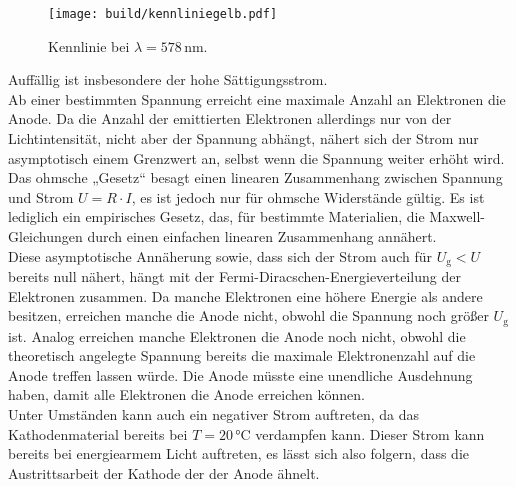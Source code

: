  \begin{figure}[H]
     \centering
     \texttt{[image: build/kennliniegelb.pdf]}
     \caption{Kennlinie bei $\lambda = 578 \,\si{\nano\meter}$.}
     \label{fig:kennliniegelb}
 \end{figure}

Auffällig ist insbesondere der hohe Sättigungsstrom. \\
Ab einer bestimmten Spannung erreicht eine maximale Anzahl an Elektronen die Anode.
Da die Anzahl der emittierten Elektronen allerdings nur von der Lichtintensität, nicht aber der Spannung abhängt, nähert sich der Strom nur asymptotisch einem Grenzwert an, selbst wenn die Spannung weiter erhöht wird.
Das ohmsche „Gesetz“ besagt einen linearen Zusammenhang zwischen Spannung und Strom $ U = R \cdot I $, es ist jedoch nur für ohmsche Widerstände gültig.  
Es ist lediglich ein empirisches Gesetz, das, für bestimmte Materialien, die Maxwell-Gleichungen durch einen einfachen linearen Zusammenhang annähert. \\

Diese asymptotische Annäherung sowie, dass sich der Strom auch für $U_\text{g} < U$ bereits null nähert, hängt mit der Fermi-Diracschen-Energieverteilung der Elektronen zusammen.
Da manche Elektronen eine höhere Energie als andere besitzen, erreichen manche die Anode nicht, obwohl die Spannung noch größer $U_\text{g}$ ist.
Analog erreichen manche Elektronen die Anode noch nicht, obwohl die theoretisch angelegte Spannung bereits die maximale Elektronenzahl auf die Anode treffen lassen würde. Die Anode müsste eine unendliche Ausdehnung haben, damit alle Elektronen die Anode erreichen können. \\

Unter Umständen kann auch ein negativer Strom auftreten, da das Kathodenmaterial bereits bei $T = 20 \,\si{\celsius}$ verdampfen kann.
Dieser Strom kann bereits bei energiearmem Licht auftreten, es lässt sich also folgern, dass die Austrittsarbeit der Kathode der der Anode ähnelt.


